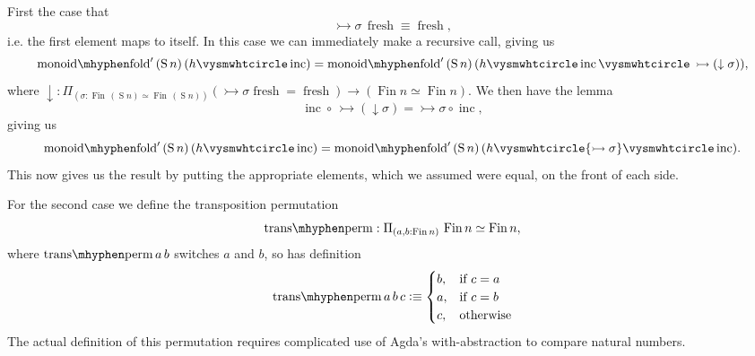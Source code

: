 \documentclass[12pt, parskip, DIV=14]{scrbook}
\newcommand{\defeq}{\vcentcolon\equiv}
\renewcommand{\circ}{\vysmwhtcircle}
\newcommand{\Fin}{\operatorname{Fin}}
\newcommand{\Suc}{\operatorname{S}}
\newcommand{\monfold}{\operatorname{monoid\mhyphen fold}}
\newcommand{\trans}{\operatorname{trans\mhyphen perm}}
\newcommand{\fresh}{\operatorname{fresh}}
\newcommand{\inc}{\operatorname{inc}}
\begin{document}
First the case that $$\rightarrowtail \sigma\,\fresh \equiv \fresh,$$ i.e. the first element maps to itself. In this case we can immediately make a recursive call, giving us
$$\monfold'\,(\Suc n)\,(h \circ \inc) = \monfold'\,(\Suc n)\,(h \circ \inc \circ\,\rightarrowtail (\downarrow\sigma)),$$ where $\downarrow : \Pi_{(\sigma : \Fin\,(\Suc n) \simeq \Fin\,(\Suc n))} ({\rightarrowtail \sigma \fresh} = \fresh) \to (\Fin n \simeq \Fin n)$. We then have the lemma
$$\inc \circ\,\rightarrowtail (\downarrow\sigma) = {\rightarrowtail \sigma} \circ \inc,$$ giving us
$$\monfold'\,(\Suc n)\,(h \circ \inc) = \monfold'\,(\Suc n)\,(h \circ {\rightarrowtail \sigma} \circ \inc).$$
This now gives us the result by putting the appropriate elements, which we assumed were equal, on the front of each side.

For the second case we define the transposition permutation $$\trans : \Pi_{(a , b : \Fin n)}\,\Fin n \simeq \Fin n,$$ where $\trans a\,b$ switches $a$ and $b$, so has definition
\[
    \trans a\,b\,c \defeq
\begin{cases}
    b,              & \text{if } c = a\\
    a,              & \text{if } c = b\\
    c,              & \text{otherwise}
\end{cases}
\]
The actual definition of this permutation requires complicated use of Agda's with-abstraction to compare natural numbers.
\end{document}
